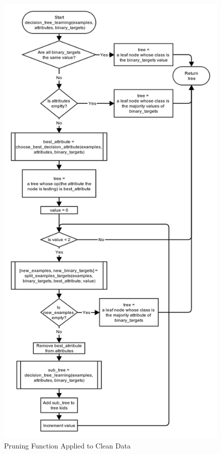 \documentclass[11pt,a4paper]{article}
\begin{document}
\begin{figure}[p]
		\includegraphics[width=\textwidth, height=\textheight]{images/flow_chart/id3.png}
     	\caption{Pruning Function Applied to Clean Data}
     	\label{fig:pruningClean}
\end{figure}
\end{document}
